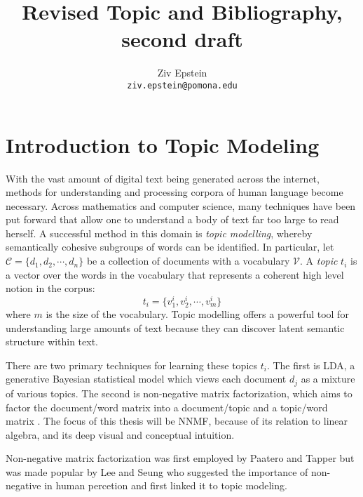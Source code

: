 \documentclass[12pt]{article}
\begin{document}
\nocite{*}

\title{Revised Topic and Bibliography, second draft}


\author{Ziv Epstein \\ 
	\texttt{ziv.epstein@pomona.edu}}

\maketitle
\section{Introduction to Topic Modeling}
With the vast amount of digital text being generated across the internet, methods for understanding and processing corpora of human language become necessary. Across mathematics and computer science, many techniques have been put forward that allow one to understand a body of text far too large to read herself. A successful method in this domain is \emph{topic modelling}, whereby semantically cohesive subgroups of words can be identified. In particular, let $\mathcal{C} = \{d_1,d_2,\cdots, d_n\}$ be a collection of documents with a vocabulary $\mathcal{V}$. A \emph{topic}  $t_i$ is a vector over the words in the vocabulary that represents a coherent high level notion in the corpus:
$$t_i = \{v^i_1, v^i_2, \cdots, v_m^i\}$$
where $m$ is the size of the vocabulary. Topic modelling offers a powerful tool for understanding large amounts of text because they can discover latent semantic structure within text. 

There are two primary techniques for learning these topics $t_i$. The first is LDA, a generative Bayesian statistical model which views each document $d_j$ as a mixture of various topics.
The second is non-negative matrix factorization, which aims to factor the document/word matrix into a document/topic and a topic/word matrix \cite{lee1999learning}. The focus of this thesis will be NNMF, because of its relation to linear algebra, and its deep visual and conceptual intuition. 

Non-negative matrix factorization was first employed by Paatero and Tapper \cite{paatero1994positive} but was made popular by Lee and Seung \cite{lee1999learning} who suggested the importance of non-negative in human percetion and first linked it to topic modeling.
\end{document}
